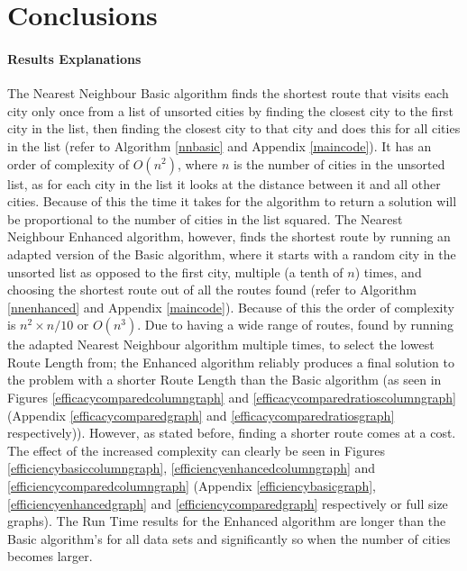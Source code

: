 \documentclass[conference,backref=page]{acmsiggraph}
\begin{document}
\section{Conclusions}
\paragraph{Results Explanations}
The Nearest Neighbour Basic algorithm finds the shortest route that visits each city only once from a list of unsorted cities by finding the closest city to the first city in the list, then finding the closest city to that city and does this for all cities in the list (refer to Algorithm \ref{nnbasic} and Appendix \ref{maincode}). It has an order of complexity of $O(n^2)$, where $n$ is the number of cities in the unsorted list, as for each city in the list it looks at the distance between it and all other cities. Because of this the time it takes for the algorithm to return a solution will be proportional to the number of cities in the list squared. The Nearest Neighbour Enhanced algorithm, however, finds the shortest route by running an adapted version of the Basic algorithm, where it starts with a random city in the unsorted list as opposed to the first city, multiple (a tenth of $n$) times, and choosing the shortest route out of all the routes found (refer to Algorithm \ref{nnenhanced} and Appendix \ref{maincode}). Because of this the order of complexity is $n^2 \times n/10$ or $O(n^3)$. Due to having a wide range of routes, found by running the adapted Nearest Neighbour algorithm multiple times, to select the lowest Route Length from; the Enhanced algorithm reliably produces a final solution to the problem with a shorter Route Length than the Basic algorithm (as seen in Figures \ref{efficacycomparedcolumngraph} and \ref{efficacycomparedratioscolumngraph} (Appendix \ref{efficacycomparedgraph} and \ref{efficacycomparedratiosgraph} respectively)). However, as stated before, finding a shorter route comes at a cost. The effect of the increased complexity can clearly be seen in Figures \ref{efficiencybasiccolumngraph}, \ref{efficiencyenhancedcolumngraph} and \ref{efficiencycomparedcolumngraph} (Appendix \ref{efficiencybasicgraph}, \ref{efficiencyenhancedgraph} and \ref{efficiencycomparedgraph} respectively or full size graphs). The Run Time results for the Enhanced algorithm are longer than the Basic algorithm's for all data sets and significantly so when the number of cities becomes larger.
\end{document}
